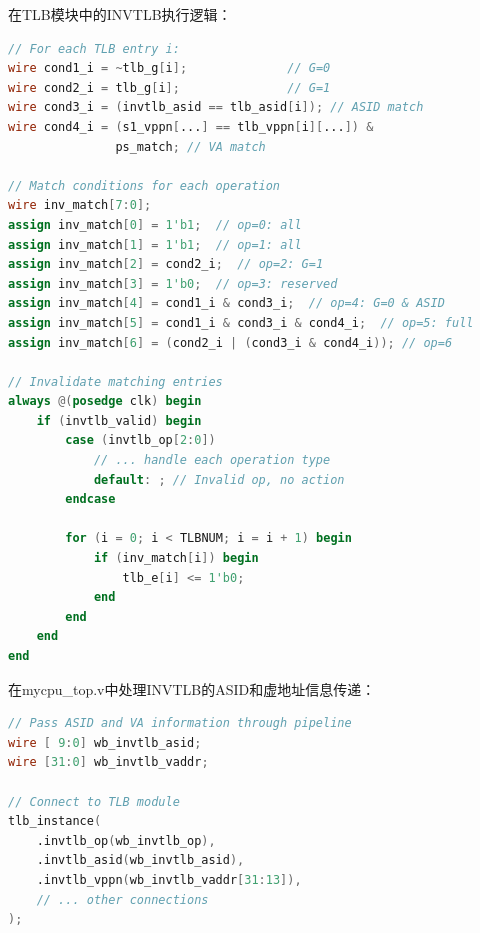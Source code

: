 在TLB模块中的INVTLB执行逻辑：

\begin{lstlisting}[language=Verilog, caption=TLB INVTLB匹配逻辑]
// For each TLB entry i:
wire cond1_i = ~tlb_g[i];              // G=0
wire cond2_i = tlb_g[i];               // G=1
wire cond3_i = (invtlb_asid == tlb_asid[i]); // ASID match
wire cond4_i = (s1_vppn[...] == tlb_vppn[i][...]) & 
               ps_match; // VA match

// Match conditions for each operation
wire inv_match[7:0];
assign inv_match[0] = 1'b1;  // op=0: all
assign inv_match[1] = 1'b1;  // op=1: all
assign inv_match[2] = cond2_i;  // op=2: G=1
assign inv_match[3] = 1'b0;  // op=3: reserved
assign inv_match[4] = cond1_i & cond3_i;  // op=4: G=0 & ASID
assign inv_match[5] = cond1_i & cond3_i & cond4_i;  // op=5: full
assign inv_match[6] = (cond2_i | (cond3_i & cond4_i)); // op=6

// Invalidate matching entries
always @(posedge clk) begin
    if (invtlb_valid) begin
        case (invtlb_op[2:0])
            // ... handle each operation type
            default: ; // Invalid op, no action
        endcase
        
        for (i = 0; i < TLBNUM; i = i + 1) begin
            if (inv_match[i]) begin
                tlb_e[i] <= 1'b0;
            end
        end
    end
end
\end{lstlisting}

在mycpu\_top.v中处理INVTLB的ASID和虚地址信息传递：

\begin{lstlisting}[language=Verilog, caption=INVTLB信息流传递]
// Pass ASID and VA information through pipeline
wire [ 9:0] wb_invtlb_asid;
wire [31:0] wb_invtlb_vaddr;

// Connect to TLB module
tlb_instance(
    .invtlb_op(wb_invtlb_op),
    .invtlb_asid(wb_invtlb_asid),
    .invtlb_vppn(wb_invtlb_vaddr[31:13]),
    // ... other connections
);
\end{lstlisting}

